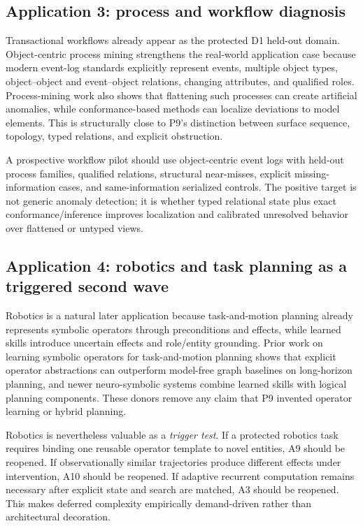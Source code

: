 \subsection{Application 3: process and workflow diagnosis}

Transactional workflows already appear as the protected D1 held-out domain. Object-centric process mining strengthens the real-world application case because modern event-log standards explicitly represent events, multiple object types, object--object and event--object relations, changing attributes, and qualified roles. Process-mining work also shows that flattening such processes can create artificial anomalies, while conformance-based methods can localize deviations to model elements. This is structurally close to P9's distinction between surface sequence, topology, typed relations, and explicit obstruction.

A prospective workflow pilot should use object-centric event logs with held-out process families, qualified relations, structural near-misses, explicit missing-information cases, and same-information serialized controls. The positive target is not generic anomaly detection; it is whether typed relational state plus exact conformance/inference improves localization and calibrated unresolved behavior over flattened or untyped views.

\subsection{Application 4: robotics and task planning as a triggered second wave}

Robotics is a natural later application because task-and-motion planning already represents symbolic operators through preconditions and effects, while learned skills introduce uncertain effects and role/entity grounding. Prior work on learning symbolic operators for task-and-motion planning shows that explicit operator abstractions can outperform model-free graph baselines on long-horizon planning, and newer neuro-symbolic systems combine learned skills with logical planning components. These donors remove any claim that P9 invented operator learning or hybrid planning.

Robotics is nevertheless valuable as a \emph{trigger test}. If a protected robotics task requires binding one reusable operator template to novel entities, A9 should be reopened. If observationally similar trajectories produce different effects under intervention, A10 should be reopened. If adaptive recurrent computation remains necessary after explicit state and search are matched, A3 should be reopened. This makes deferred complexity empirically demand-driven rather than architectural decoration.

